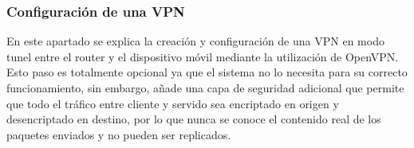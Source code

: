 \documentclass[12pt]{article}
\begin{document}

        \subsubsection{Configuración de una VPN} 
            En este apartado se explica la creación y configuración de una VPN en modo tunel entre el router y el dispositivo móvil mediante la utilización de OpenVPN. Esto paso es totalmente opcional ya que el sistema no lo necesita para su correcto funcionamiento, sin embargo, añade una capa de seguridad adicional que permite que todo el tráfico entre cliente y servido sea encriptado en origen y desencriptado en destino, por lo que nunca se conoce el contenido real de los paquetes enviados y no pueden ser replicados.
\end{document}
